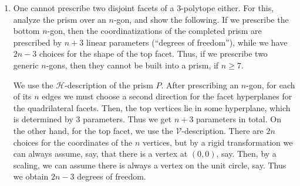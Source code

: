 \documentclass{article}
\begin{document}
\begin{enumerate}
\begin{remark}
    This question (as well as the next two) are slightly confusing. Forgive if wrong interpretations or assumptions are made (alternatively, let me know so I can fix them!)

    As Ziegler defined in Section 4.4, choosing a polytope refers to its combinatorial equivalence class, and prescribing the shape of a facet means fixing coordinates of the vertices in the facet, up to a rigid transformation. As well note that "prism" refers not to the prism operation, but just a generic prism.
\end{remark}

\begin{solution}
    In this specific (counter-)example, fix the polytope as "triangular prism" and prescribe one rectangular facet with parallel edges $a, b$. If the third edge $c$ is not parallel to $a,b$, its easy to see that more edges will spawn in, because the vertices of edges $a$ and $c$ no longer lie in a plane. Indeed, the length of $c$ can vary freely, but we see that essentially a general "prescription" of $c$ will not produce a triangular prism along with the prescribed facet.
    
\end{solution}

\item One cannot prescribe two disjoint facets of a $3$-polytope either. For this, analyze the prism over an $n$-gon, and show the following. If we prescribe the bottom $n$-gon, then the coordinatizations of the completed prism are prescribed by $n+3$ linear parameters (``degrees of freedom''), while we have $2n-3$ choices for the shape of the top facet. Thus, if we prescribe two generic $n$-gons, then they cannot be built into a prism, if $n\ge 7$.

\begin{solution}
    We use the $\mathcal{H}$-description of the prism $P$. After prescribing an $n$-gon, for each of its $n$ edges we must choose a second direction for the facet hyperplanes for the quadrilateral facets. Then, the top vertices lie in some hyperplane, which is determined by $3$ parameters. Thus we get $n+3$ parameters in total. On the other hand, for the top facet, we use the $\mathcal{V}$-description. There are $2n$ choices for the coordinates of the $n$ vertices, but by a rigid transformation we can always assume, say, that there is a vertex at $(0,0)$, say. Then, by a scaling, we can assume there is always a vertex on the unit circle, say. Thus we obtain $2n-3$ degrees of freedom.
    

\end{solution}
\end{enumerate}
\end{document}
